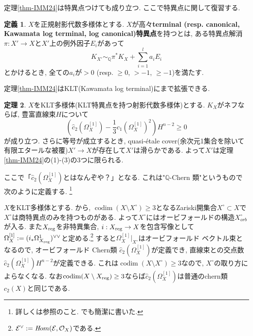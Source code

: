 \documentclass[dvipdfmx]{msjproc}
\theoremstyle{definition}
\newtheorem{thm}{定理}[section]
\newtheorem{dfn}[thm]{定義}
\newcommand{\codim}[0]{\operatorname{codim}}
\newcommand{\reg}{{\rm{reg}}}
\newcommand{\Q}{\mathbb{Q}}
\begin{document}
定理\ref{thm-IMM24}は特異点つけても成り立つ. 
ここで特異点に関して復習する. 
\begin{dfn}
$X$を正規射影代数多様体とする. 
$X$が高々{\bf terminal (resp. canonical, Kawamata log terminal, log canonical)特異点}を持つとは, ある特異点解消
$\pi : X' \to X$と$X'$上の例外因子$E_i$があって
$$
K_{X'} \sim_{\Q} \pi^{*}K_X + \sum_{i=1}^{l}a_{i} E_i
$$
とかけるとき, 全ての$a_i$が$>0$ (resp. $\ge 0$, $>-1$, $\ge -1$)を満たす.
\end{dfn}

定理\ref{thm-IMM24}はKLT(Kawamata log terminal)にまで拡張できる.

\begin{thm}\cite{IMM24}
$X$をKLT多様体(KLT特異点を持つ射影代数多様体)とする. 
$K_X$がネフならば, 豊富直線束$H$について
\begin{equation}
\label{eq-Miyaoka-KLY}
\left( \widehat{c}_2(\Omega_{X}^{[1]}) - \frac{1}{3}c_1(\Omega_{X}^{[1]})^2 \right) H^{n-2} \ge0
\end{equation}
が成り立つ.
さらに等号が成立するとき, quasi-\'etale cover(余次元1集合を除いて有限エタールな被覆)$X' \to X$が存在して$X'$は滑らかである. よって$X'$は定理\ref{thm-IMM24}の(1)-(3)の3つに限られる. 
\end{thm}

ここで「$\widehat{c}_2(\Omega_{X}^{[1]}) $とはなんぞや？」となる.
これは"$\Q$-Chern 類"というもので次のように定義する. \footnote{詳しくは\cite{GKPT19b}参照のこと.  \cite{IMM24}でも簡潔に書いた.}
 
$X$をKLT多様体とする.
\cite{GKP16}から, $\codim (X \setminus X^{\circ}) \ge 3$となるZariski開集合$X^{\circ} \subset X$で$X^{\circ}$は商特異点のみを持つものがある. 
よって$X^{\circ}$にはオービフォールドの構造$X^{\circ}_{orb}$が入る. 
また$X_{\reg}$を非特異集合, $i : X_{\reg} \to X$を包含写像として
$\Omega_{X}^{[1]} :=(i_{*}\Omega_{X_{\reg}}^{1})^{\vee\vee}$と定める.\footnote{$\mathcal{E}^{\vee}:= {\textit Hom}(\mathcal{E}, \mathcal{O}_X)$である.}
すると$\Omega_{X}^{[1]}|_{X^{\circ}}$はオービフォールド ベクトル束となるので, 
オービフォールド Chern類 $\widehat{c}_2(\Omega_{X}^{[1]}) $が定義でき,  直線束との交点数$\widehat{c}_2(\Omega_{X}^{[1]})  H^{n-2}$が定義できる. これは$\codim (X \setminus X^{\circ}) \ge 3$なので, $X^{\circ}$の取り方によらなくなる.  なお$\codim (X \setminus X_{\reg}) \ge 3$ならば$\widehat{c}_2(\Omega_{X}^{[1]}) $は普通のchern類$c_2(X) $と同じである. 
\end{document}
